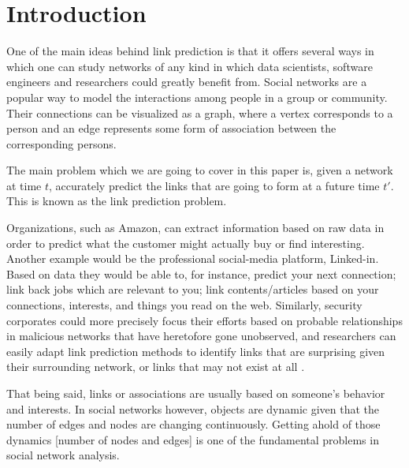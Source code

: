 \documentclass{acm_proc_article-sp}
\begin{document}



\section{Introduction}
\label{Sect.1}

One of the main ideas behind link prediction is that it offers several ways in which one can study networks of any kind in which data scientists, software engineers and researchers could greatly benefit from. Social networks are a popular way to model the interactions among people in a group or community. Their connections can be visualized as a graph, where a vertex corresponds to a person and an edge represents some form of association between the corresponding persons.

The main problem which we are going to cover in this paper is, given a network at time $t$, accurately predict the links that are going to form at a future time $t'$. This is known as the link prediction problem.

Organizations, such as Amazon, can extract information based on raw data in order to predict what the customer might actually buy or find interesting. Another example would be the professional social-media platform, Linked-in.  Based on data they would be able to, for instance, predict your next connection; link back jobs which are relevant to you; link contents/articles based on your connections, interests, and things you read on the web. Similarly, security corporates could more precisely focus their efforts based on probable relationships in malicious networks that have heretofore gone unobserved, and researchers can easily adapt link prediction methods to identify links that are surprising given their surrounding network, or links that may not exist at all \cite{Lichtenwalter:2010:NPM:1835804.1835837}. 

That being said, links or associations are usually based on someone's behavior and interests. In social networks however, objects are dynamic given that the number of edges and nodes are changing continuously. Getting ahold of those dynamics [number of nodes and edges] is one of the fundamental problems in social network analysis. 
\end{document}
